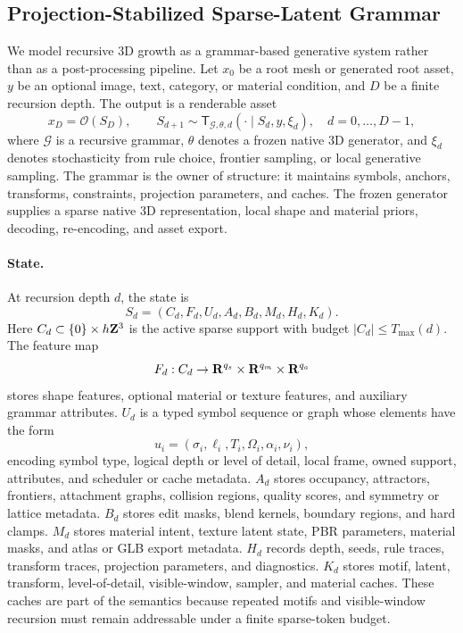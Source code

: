 \subsection{Projection-Stabilized Sparse-Latent Grammar}

We model recursive 3D growth as a grammar-based generative system rather than as a post-processing pipeline. Let \(x_0\) be a root mesh or generated root asset, \(y\) be an optional image, text, category, or material condition, and \(D\) be a finite recursion depth. The output is a renderable asset
\begin{equation}
x_D=\mathcal{O}(S_D),\qquad
S_{d+1}\sim \mathsf{T}_{\mathcal{G},\theta,d}(\cdot\mid S_d,y,\xi_d),
\quad d=0,\ldots,D-1,
\end{equation}
where \(\mathcal{G}\) is a recursive grammar, \(\theta\) denotes a frozen native 3D generator, and \(\xi_d\) denotes stochasticity from rule choice, frontier sampling, or local generative sampling. The grammar is the owner of structure: it maintains symbols, anchors, transforms, constraints, projection parameters, and caches. The frozen generator supplies a sparse native 3D representation, local shape and material priors, decoding, re-encoding, and asset export.

\paragraph{State.}
At recursion depth \(d\), the state is
\begin{equation}
S_d=(C_d,F_d,U_d,A_d,B_d,M_d,H_d,K_d).
\end{equation}
Here \(C_d\subset \{0\}\times h{\bf Z}^3\) is the active sparse support with budget \(|C_d|\leq T_{\max}(d)\). The feature map
\begin{equation}
F_d:C_d\rightarrow {\bf R}^{q_s}\times{\bf R}^{q_m}\times{\bf R}^{q_a}
\end{equation}
stores shape features, optional material or texture features, and auxiliary grammar attributes. \(U_d\) is a typed symbol sequence or graph whose elements have the form
\begin{equation}
u_i=(\sigma_i,\ell_i,T_i,\Omega_i,\alpha_i,\nu_i),
\end{equation}
encoding symbol type, logical depth or level of detail, local frame, owned support, attributes, and scheduler or cache metadata. \(A_d\) stores occupancy, attractors, frontiers, attachment graphs, collision regions, quality scores, and symmetry or lattice metadata. \(B_d\) stores edit masks, blend kernels, boundary regions, and hard clamps. \(M_d\) stores material intent, texture latent state, PBR parameters, material masks, and atlas or GLB export metadata. \(H_d\) records depth, seeds, rule traces, transform traces, projection parameters, and diagnostics. \(K_d\) stores motif, latent, transform, level-of-detail, visible-window, sampler, and material caches. These caches are part of the semantics because repeated motifs and visible-window recursion must remain addressable under a finite sparse-token budget.

